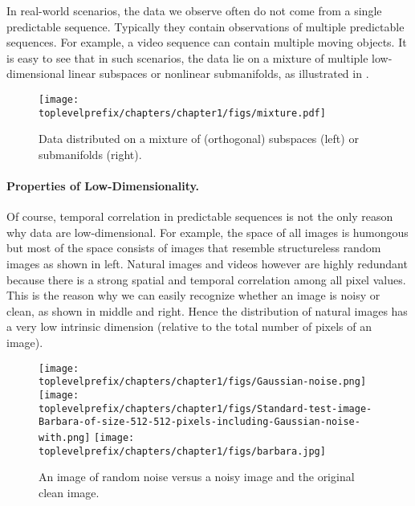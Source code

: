 \documentclass[\toplevelprefix/book-main.tex]{subfiles}
\begin{document}
In real-world scenarios, the data we observe often do not come from a single predictable sequence. Typically they contain observations of multiple predictable sequences. For example, a video sequence can contain multiple moving objects. It is easy to see that in such scenarios, the data lie on a mixture of multiple low-dimensional linear subspaces or nonlinear submanifolds, as illustrated in . 
\begin{figure}
    \centering
    \texttt{[image: \\toplevelprefix/chapters/chapter1/figs/mixture.pdf]}
    \caption{Data distributed on a mixture of (orthogonal) subspaces (left) or submanifolds (right).}
    \label{fig:mixture-models}
\end{figure}


\paragraph{Properties of Low-Dimensionality.}
Of course, temporal correlation in predictable sequences is not the only reason why data are low-dimensional. For example, the space of all images is humongous but most of the space consists of images that resemble structureless random images as shown in  left. Natural images and videos however are highly redundant because there is a strong spatial and temporal correlation among all pixel values. This is the reason why we can easily recognize whether an image is noisy or clean, as shown in  middle and right. Hence the distribution of natural images has a very low intrinsic dimension (relative to the total number of pixels of an image).

\begin{figure}
    \centering
    \texttt{[image: \\toplevelprefix/chapters/chapter1/figs/Gaussian-noise.png]}\hspace{2mm} 
    \texttt{[image: \\toplevelprefix/chapters/chapter1/figs/Standard-test-image-Barbara-of-size-512-512-pixels-including-Gaussian-noise-with.png]} \hspace{2mm} 
    \texttt{[image: \\toplevelprefix/chapters/chapter1/figs/barbara.jpg]}
    \caption{An image of random noise versus a noisy image and the original clean image. %
    }
    \label{fig:noise-image}
\end{figure}
\end{document}
